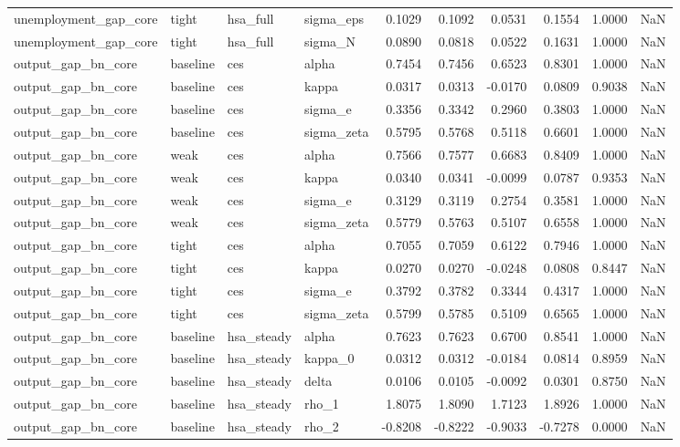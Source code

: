 \begin{tabular}{llllrrrrrl}
unemployment\_gap\_core & tight & hsa\_full & sigma\_eps & 0.1029 & 0.1092 & 0.0531 & 0.1554 & 1.0000 & NaN \\
unemployment\_gap\_core & tight & hsa\_full & sigma\_N & 0.0890 & 0.0818 & 0.0522 & 0.1631 & 1.0000 & NaN \\
output\_gap\_bn\_core & baseline & ces & alpha & 0.7454 & 0.7456 & 0.6523 & 0.8301 & 1.0000 & NaN \\
output\_gap\_bn\_core & baseline & ces & kappa & 0.0317 & 0.0313 & -0.0170 & 0.0809 & 0.9038 & NaN \\
output\_gap\_bn\_core & baseline & ces & sigma\_e & 0.3356 & 0.3342 & 0.2960 & 0.3803 & 1.0000 & NaN \\
output\_gap\_bn\_core & baseline & ces & sigma\_zeta & 0.5795 & 0.5768 & 0.5118 & 0.6601 & 1.0000 & NaN \\
output\_gap\_bn\_core & weak & ces & alpha & 0.7566 & 0.7577 & 0.6683 & 0.8409 & 1.0000 & NaN \\
output\_gap\_bn\_core & weak & ces & kappa & 0.0340 & 0.0341 & -0.0099 & 0.0787 & 0.9353 & NaN \\
output\_gap\_bn\_core & weak & ces & sigma\_e & 0.3129 & 0.3119 & 0.2754 & 0.3581 & 1.0000 & NaN \\
output\_gap\_bn\_core & weak & ces & sigma\_zeta & 0.5779 & 0.5763 & 0.5107 & 0.6558 & 1.0000 & NaN \\
output\_gap\_bn\_core & tight & ces & alpha & 0.7055 & 0.7059 & 0.6122 & 0.7946 & 1.0000 & NaN \\
output\_gap\_bn\_core & tight & ces & kappa & 0.0270 & 0.0270 & -0.0248 & 0.0808 & 0.8447 & NaN \\
output\_gap\_bn\_core & tight & ces & sigma\_e & 0.3792 & 0.3782 & 0.3344 & 0.4317 & 1.0000 & NaN \\
output\_gap\_bn\_core & tight & ces & sigma\_zeta & 0.5799 & 0.5785 & 0.5109 & 0.6565 & 1.0000 & NaN \\
output\_gap\_bn\_core & baseline & hsa\_steady & alpha & 0.7623 & 0.7623 & 0.6700 & 0.8541 & 1.0000 & NaN \\
output\_gap\_bn\_core & baseline & hsa\_steady & kappa\_0 & 0.0312 & 0.0312 & -0.0184 & 0.0814 & 0.8959 & NaN \\
output\_gap\_bn\_core & baseline & hsa\_steady & delta & 0.0106 & 0.0105 & -0.0092 & 0.0301 & 0.8750 & NaN \\
output\_gap\_bn\_core & baseline & hsa\_steady & rho\_1 & 1.8075 & 1.8090 & 1.7123 & 1.8926 & 1.0000 & NaN \\
output\_gap\_bn\_core & baseline & hsa\_steady & rho\_2 & -0.8208 & -0.8222 & -0.9033 & -0.7278 & 0.0000 & NaN \\

\end{tabular}
